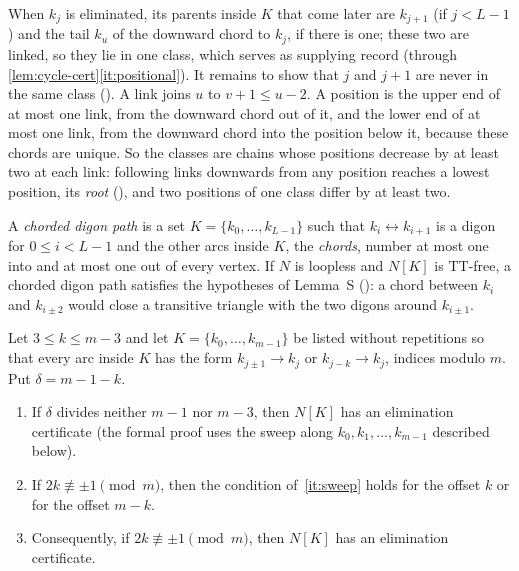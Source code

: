 \begin{outline}
When $k_j$ is eliminated, its parents inside $K$ that come later are $k_{j+1}$ (if $j<L-1$) and the tail $k_u$ of the
downward chord to $k_j$, if there is one; these two are linked, so they lie in one class, which serves as supplying record
(through \cref{lem:cycle-cert}\ref{it:positional}). It remains to show that $j$ and $j+1$ are never in the same class
(). A link joins $u$ to $v+1\le u-2$. A position is the upper end of at most one link, from the
downward chord out of it, and the lower end of at most one link, from the downward chord into the position below it,
because these chords are unique. So the classes are chains whose positions decrease by at least two at each link:
following links downwards from any position reaches a lowest position, its \emph{root} (), and two
positions of one class differ by at least two.
\end{outline}

A \emph{chorded digon path} is a set $K=\{k_0,\dots,k_{L-1}\}$ such that $k_i\leftrightarrow k_{i+1}$ is a digon for
$0\le i<L-1$ and the other arcs inside $K$, the \emph{chords}, number at most one into and at most one out of every vertex.
If $N$ is loopless and $N[K]$ is TT-free, a chorded digon path satisfies the hypotheses of Lemma~S
(): a chord between $k_i$ and $k_{i\pm2}$ would close a transitive triangle with the two digons
around $k_{i\pm1}$.

\begin{proposition}\label{prop:CC}
Let $3\le k\le m-3$ and let $K=\{k_0,\dots,k_{m-1}\}$ be listed without repetitions so that every arc inside $K$ has the
form $k_{j\pm1}\to k_j$ or $k_{j-k}\to k_j$, indices modulo $m$. Put $\delta=m-1-k$.
\begin{enumerate}[label=(\alph*)]
\item\label{it:sweep} If $\delta$ divides neither $m-1$ nor $m-3$, then $N[K]$ has an elimination certificate (the
formal proof uses the sweep along $k_0,k_1,\dots,k_{m-1}$ described below).
\item\label{it:arith} If $2k\not\equiv\pm1\pmod m$, then the condition of~\ref{it:sweep} holds for the offset $k$ or for
the offset $m-k$.
\item\label{it:mirror} Consequently, if $2k\not\equiv\pm1\pmod m$, then $N[K]$ has an elimination certificate.
\end{enumerate}
\end{proposition}

